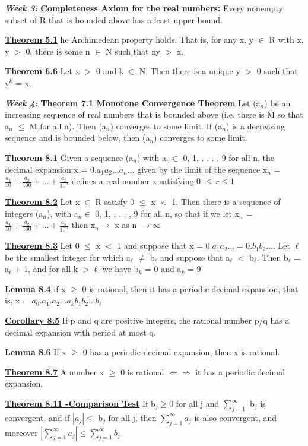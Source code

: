 \documentclass[10pt]{article}
\begin{document}
\par\textbf{\underline{\textit{Week 3:}}}
\textbf{\underline{Completeness Axiom for the real numbers:}}
Every nonempty subset of R that is bounded above has a least upper bound.
\par\textbf{\underline{Theorem 5.1}}
he Archimedean property holds. That is, for any x, y $\in$ R with x, y $>$ 0,
there is some n $\in$ N such that ny $>$ x.
\par\textbf{\underline{Theorem 6.6}}
Let x $>$ 0 and k $\in$ N. Then there is a unique y $>$ 0 such that y$^k$ = x.

\par\textbf{\underline{\textit{Week 4:}}}
\textbf{\underline{Theorem 7.1 Monotone Convergence Theorem}}
Let (a$_n$) be an increasing
sequence of real numbers that is bounded above (i.e. there is M so that a$_n$ $\leq$ M for all
n). Then (a$_n$) converges to some limit. If (a$_n$) is a decreasing sequence and is bounded
below, then (a$_n$) converges to some limit.
\par\textbf{\underline{Theorem 8.1}}
Given a sequence (a$_n$) with a$_n \in$ {0, 1, . . . , 9} for all n, the decimal expansion
x = 0.$a_1a_2 . . . a_n . . .$ given by the limit of the sequence
x$_n$ = $ \frac{a_1}{10}+ \frac{a_2}{100} +\dots+ \frac{a_n}{10^n}$ 
defines a real number x satisfying 0 $\leq x \leq 1$
\par\textbf{\underline{Theorem 8.2}}
Let x $\in$ R satisfy 0 $\leq$ x $<$ 1. Then there is a sequence of integers (a$_n$), with
a$_n \in$ {0, 1, . . . , 9} for all n, so that if we let
x$_n$ = $ \frac{a_1}{10}+ \frac{a_2}{100} +\dots+ \frac{a_n}{10^n}$ 
then x$_n \rightarrow$ x as n $\rightarrow \infty$
\par\textbf{\underline{Theorem 8.3}}
Let 0 $\leq$ x $<$ 1 and suppose that x = 0.$a_1a_2 . . . = 0.b_1b_2 . . . .$ Let $\ell$ be the smallest
integer for which a$_\ell$ $\neq$ b$_\ell$ and suppose that a$_\ell$ $<$ b$_\ell$. Then b$_\ell$ = a$_\ell$ + 1, and for all k $> \ell$ we
have b$_k$ = 0 and a$_k$ = 9
\par\textbf{\underline{Lemma 8.4}}
if x $\geq$ 0 is rational, then it has a periodic decimal expansion, that is,
x = $a_0.a_1.a_2\dots a_k \overline{b_1b_2\dots b_\ell}$
\par\textbf{\underline{Corollary 8.5}}
If p and q are positive integers, the rational number p/q has a decimal
expansion with period at most q.
\par\textbf{\underline{Lemma 8.6}}
If x $\geq$ 0 has a periodic decimal expansion, then x is rational.
\par\textbf{\underline{Theorem 8.7}}
A number x $\geq$ 0 is rational $\Leftarrow \Rightarrow$ it has a periodic decimal expansion.
\par\textbf{\underline{Theorem 8.11 -Comparison Test}}
If b$_j \geq $0 for all j and $\sum_{j=1}^{\infty}$
b$_j$ is convergent, and if
$|a_j| \leq$ b$_j$ for all j, then $\sum_{j=1}^{\infty} a_j$
is also convergent, and moreover $|\sum_{j=1}^{\infty} a_j| \leq \sum_{j=1}^{\infty} b_j$
\end{document}

